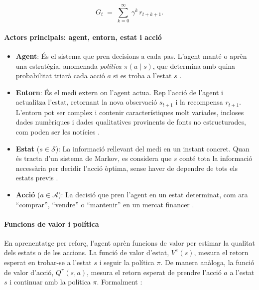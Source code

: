 \documentclass[12pt,a4paper,twoside]{book}
\begin{document}
\begin{equation}
G_t \;=\; \sum_{k=0}^{\infty} \,\gamma^k \, r_{t+k+1}.
\end{equation}

\paragraph{Actors principals: agent, entorn, estat i acció}

\begin{itemize}
\item \textbf{Agent}: És el sistema que pren decisions a cada pas. L'agent manté o aprèn una estratègia, anomenada \emph{política} $\pi(a \mid s)$, que determina amb quina probabilitat triarà cada acció $a$ si es troba a l'estat $s$ \cite{M1}.

\item \textbf{Entorn}: És el medi extern on l'agent actua. Rep l'acció de l'agent i actualitza l'estat, retornant la nova observació $s_{t+1}$ i la recompensa $r_{t+1}$. L'entorn pot ser complex i contenir característiques molt variades, incloses dades numèriques i dades qualitatives provinents de fonts no estructurades, com poden ser les notícies \cite{M1}.

\item \textbf{Estat} ($s \in \mathcal{S}$): La informació rellevant del medi en un instant concret. Quan és tracta d'un sistema de Markov, es considera que $s$ conté tota la informació necessària per decidir l'acció òptima, sense haver de dependre de tots els estats previs \cite{M1}.

\item \textbf{Acció} ($a \in \mathcal{A}$): La decisió que pren l'agent en un estat determinat, com ara “comprar”, “vendre” o “mantenir” en un mercat financer \cite{M1}.
\end{itemize}

\paragraph{Funcions de valor i política}

En aprenentatge per reforç, l'agent aprèn funcions de valor per estimar la qualitat dels estats o de les accions. La funció de valor d'estat, $V^\pi(s)$, mesura el retorn esperat en trobar-se a l'estat $s$ i seguir la política $\pi$. De manera anàloga, la funció de valor d'acció, $Q^\pi(s,a)$, mesura el retorn esperat de prendre l'acció $a$ a l'estat $s$ i continuar amb la política $\pi$. Formalment \cite{M1}:
\end{document}
